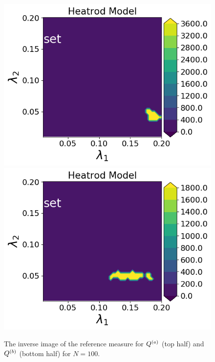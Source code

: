 \begin{figure}
\begin{minipage}{.4\textwidth}
\includegraphics[width=\linewidth]{examples/fig_heatrod_q2/HeatrodModel--set_N50_em.png}
\includegraphics[width=\linewidth]{examples/fig_heatrod_q2/HeatrodModel--set_N500_em.png}
\end{minipage}
\caption{The inverse image of the reference measure for $Q^{(a)}$ (top half) and $Q^{(b)}$ (bottom half) for $N=100$. }
\label{fig:heatrod-convergence}
\end{figure}

